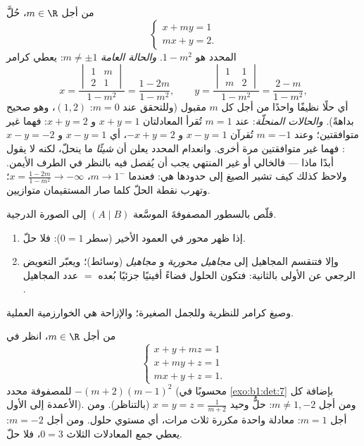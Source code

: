 \begin{example}
\label{ex:b1:det:cramerparameter}
من أجل $m \in \R$، حُلَّ
\[
\begin{cases}
x + m y = 1\\
m x + y = 2 .
\end{cases}
\]
المحدد هو $1 - m^2$. \emph{والحالة العامة} $m \neq \pm1$:
يعطي كرامر
\[
x = \frac{\begin{vmatrix} 1 & m\\ 2 & 1\end{vmatrix}}{1 - m^2}
= \frac{1 - 2m}{1 - m^2},
\qquad
y = \frac{\begin{vmatrix} 1 & 1\\ m & 2\end{vmatrix}}{1 - m^2}
= \frac{2 - m}{1 - m^2},
\]
أي حلًا نظيفًا واحدًا من أجل كل $m$ مقبول (وللتحقق عند $m = 0$:
$(1, 2)$، وهو صحيح بداهةً). \emph{والحالات المنحلّة}: عند $m = 1$
تُقرأ المعادلتان $x + y = 1$ و $x + y = 2$: فهما غير متوافقتين؛ وعند
$m = -1$ تُقرآن $x - y = 1$ و $-x + y = 2$، أي $x - y =
1$ و $x - y = -2$: فهما غير متوافقتين مرة أخرى. وانعدام
المحدد يعلن أن \emph{شيئًا} ما ينحلّ، لكنه
لا يقول أبدًا ماذا --- فالخالي أو غير المنتهي يجب أن يُفصل فيه بالنظر
في الطرف الأيمن. ولاحظ كذلك كيف تشير الصيغ إلى
حدودها هي: فعندما $m \to 1^{-}$، $x = \frac{1 - 2m}{1 - m^2} \to
-\infty$؛ وتهرب نقطة الحلّ كلما صار المستقيمان
متوازيين.
\end{example}

\begin{method}\label{met:b1:det:gauss}
قلّص بالسطور المصفوفةَ الموسَّعة $(A \mid B)$ إلى الصورة
الدرجية.
\begin{enumerate}
  \item إذا ظهر محور في العمود الأخير (سطر $0 = 1$): فلا
        حلّ.
  \item وإلا فتنقسم المجاهيل إلى \emph{مجاهيل محورية} و
        \emph{مجاهيل } (وسائط)؛ ويعبّر التعويض الرجعي
        عن الأولى بالثانية: فتكون  الحلول فضاءً
        أفينيًا جزئيًا بُعده $=$ عدد المجاهيل .
\end{enumerate}
وصيغ كرامر للنظرية وللجمل الصغيرة؛ والإزاحة هي
الخوارزمية العملية.
\end{method}

\begin{example}\label{ex:b1:det:parameter}
من أجل $m \in \R$، انظر في
\[
\begin{cases}
x + y + mz = 1\\
x + my + z = 1\\
mx + y + z = 1 .
\end{cases}
\]
للمصفوفة محدد $-(m+2)(m-1)^2$ (محسوبًا في
\cref{exo:b1:det:7} بإضافة كل الأعمدة إلى الأول). ومن أجل $m
\neq 1, -2$:
حلٌّ وحيد $x = y = z = \frac{1}{m+2}$ (بالتناظر). ومن أجل $m =
1$: معادلة واحدة مكررة ثلاث مرات، أي مستوي حلول. ومن أجل $m =
-2$: يعطي جمع المعادلات الثلاث $0 = 3$، فلا حلّ.
\end{example}

